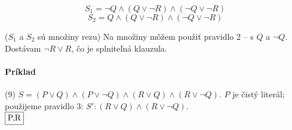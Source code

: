 \par
$$S_1 = \neg Q \land (Q \lor \neg R) \land (\neg Q \lor \neg R)$$
$$S_2 = Q \land (Q \lor \neg R) \land (\neg Q \lor \neg R)$$

($S_1$ a $S_2$ sú množiny rezu)
Na množiny môžem použiť pravidlo 2 -- s $Q$ a $\neg Q$. Dostávam $\neg R \lor
R$, čo je splniteľná klauzula.

\paragraph{Príklad} (9) $S=(P \lor Q) \land (P \lor \neg Q) \land (R \lor Q)
\land (R \lor \neg Q)$. $P$ je čistý literál; použijeme pravidlo 3:
$S': (R \lor Q) \land (R \lor \neg Q)$. \\
$\fbox{P,R}$ \\

